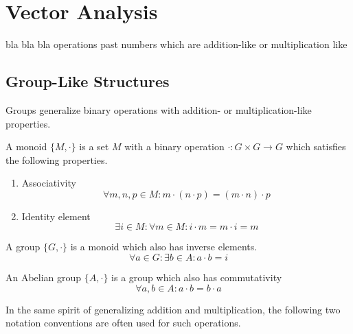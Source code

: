 \chapter{Vector Analysis}
\label{chapter:Vector-Analysis}


bla bla bla operations past numbers which are addition-like or multiplication like

\section{Group-Like Structures}

Groups generalize binary operations with addition- or multiplication-like properties.

\begin{definition}[Monoid]
	A monoid $\{ M, \cdot \}$ is a set $M$ with a binary operation $\cdot: G \times G \rightarrow G$ which satisfies the following properties.
	\begin{enumerate}
		\item Associativity
		\begin{equation}
			\forall m, n, p \in M: m \cdot (n \cdot p) = (m \cdot n) \cdot p
		\end{equation}
		\item Identity element
		\begin{equation}
			\exists i \in M: \forall m \in M: i \cdot m = m \cdot i = m
		\end{equation}
	\end{enumerate}
\end{definition}

\begin{definition}[Group]
	A group $\{ G, \cdot \}$ is a monoid which also has inverse elements.
	\begin{equation}
		\forall a \in G: \exists b \in A: a \cdot b = i
	\end{equation}
\end{definition}

\begin{definition}
	An Abelian group $\{A, \cdot\}$ is a group which also has commutativity
	\begin{equation}
		\forall a, b \in A: a \cdot b = b \cdot a
	\end{equation}
\end{definition}

In the same spirit of generalizing addition and multiplication, the following two notation conventions are often used for such operations.

